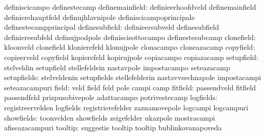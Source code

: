                                  definiscicampo                   definestecamp
                 definemainfield: definieerhoofdveld               definemainfield
                                  definierehauptfeld               definujhlavnipole
                                  definiscicampoprincipale         definestecampprincipal
                  definesubfield: definieersubveld                 definesubfield
                                  definieresubfeld                 definujpodpole
                                  definiscisottocampo              definestesubcamp
                      clonefield: kloonveld                        clonefield
                                  klonierefeld                     klonujpole
                                  clonacampo                       cloneazacamp
                       copyfield: copieerveld                      copyfield
                                  kopierefeld                      kopirujpole
                                  copiacampo                       copiazacamp
                      setupfield: stelveldin                       setupfield
                                  stellefeldein                    nastavpole
                                  impostacampo                     seteazacamp
                     setupfields: stelveldenin                     setupfields
                                  stellefelderin                   nastavvsechnapole
                                  impostacampi                     seteazacampuri
                           field: veld                             field
                                  feld                             pole
                                  campi                            camp
                        fitfield: passendveld                      fitfield
                                  passendfeld                      prizpusobivepole %
                                  adattacampo                      potrivestecamp
                       logfields: registreervelden                 logfields
                                  registrierefelder                zaznamovepole
                                  logcampi                         logcampuri %
                      showfields: toonvelden                       showfields
                                  zeigefelder                      ukazpole
                                  mostracampi                      afiseazacampuri
                         tooltip: suggestie                        tooltip
                                  tooltip                          bublinkovanapoveda
